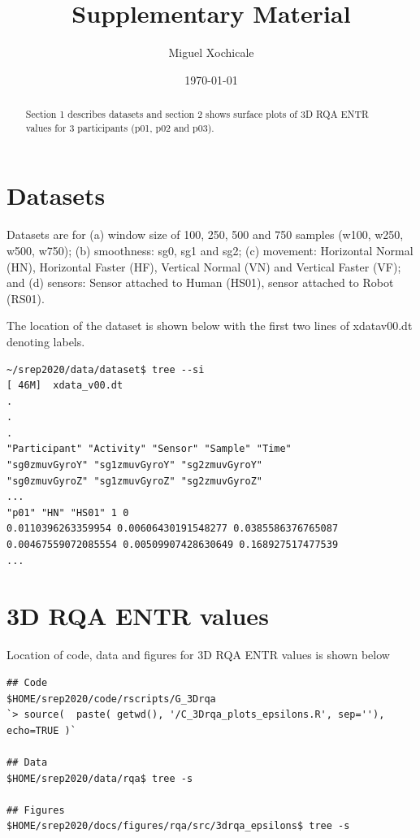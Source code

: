\documentclass[12pt]{article}
\title{
Supplementary Material
}
\author{Miguel Xochicale}
\date{ \today }
\begin{document}
\maketitle

\begin{abstract}
Section 1 describes datasets and section 2 shows surface plots of 3D RQA ENTR values for 3 participants (p01, p02 and p03).
\end{abstract}

\tableofcontents


\section{Datasets}
Datasets are for 
(a) window size of 100, 250, 500 and 750 samples (w100, w250, w500, w750);
(b) smoothness: sg0, sg1 and sg2;
(c) movement: Horizontal Normal (HN), Horizontal Faster (HF), Vertical Normal (VN) and Vertical Faster (VF); and 
(d) sensors: Sensor attached to Human (HS01), sensor attached to Robot (RS01).

The location of the dataset is shown below with the first two lines of xdatav00.dt denoting labels.
\begin{verbatim}
~/srep2020/data/dataset$ tree --si
[ 46M]  xdata_v00.dt
.
.
.
"Participant" "Activity" "Sensor" "Sample" "Time" 
"sg0zmuvGyroY" "sg1zmuvGyroY" "sg2zmuvGyroY" 
"sg0zmuvGyroZ" "sg1zmuvGyroZ" "sg2zmuvGyroZ"
...
"p01" "HN" "HS01" 1 0 
0.0110396263359954 0.00606430191548277 0.0385586376765087 
0.00467559072085554 0.00509907428630649 0.168927517477539
...
\end{verbatim}


\section{3D RQA ENTR values}
Location of code, data and figures for 3D RQA ENTR values is shown below 
\begin{verbatim}
## Code
$HOME/srep2020/code/rscripts/G_3Drqa
`> source(  paste( getwd(), '/C_3Drqa_plots_epsilons.R', sep=''), echo=TRUE )`

## Data
$HOME/srep2020/data/rqa$ tree -s 

## Figures
$HOME/srep2020/docs/figures/rqa/src/3drqa_epsilons$ tree -s
\end{verbatim}
\end{document}
